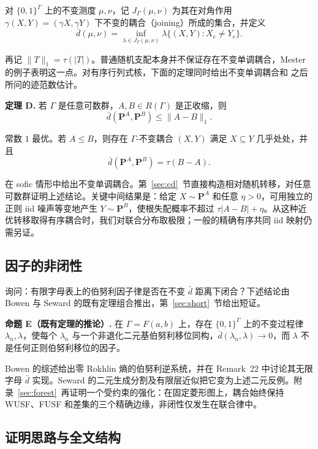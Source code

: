 \documentclass[UTF8,zihao=-4,a4paper]{ctexart}
\numberwithin{equation}{section}
\begin{document}
对 \(\{0,1\}^\Gamma\) 上的不变测度 \(\mu,\nu\)，记 \(J_\Gamma(\mu,\nu)\) 为其在对角作用 \(\gamma(X,Y)=(\gamma X,\gamma Y)\) 下不变的耦合（joining）所成的集合，并定义
\[
 \bar d(\mu,\nu)
 =\inf_{\lambda\in J_\Gamma(\mu,\nu)}
       \lambda\{(X,Y):X_e\ne Y_e\}.
\]

再记 \(\|T\|_1=\tau(|T|)\)。普通随机支配本身并不保证存在不变单调耦合，Mester 的例子表明这一点\cite[Theorem~1.5]{Mester}。对有序行列式核，下面的定理同时给出不变单调耦合和 \cite[Lemma~7.8]{LT}之后所问的迹范数估计。

\textbf{定理 D.} 若 \(\Gamma\) 是任意可数群，\(A,B\in R(\Gamma)\) 是正收缩，则
\[
 \bar d(\mathbf P^A,\mathbf P^B)\le\|A-B\|_1.
 \tag{D}\label{eq:D}
\]

常数 \(1\) 最优。若 \(A\le B\)，则存在 \(\Gamma\)-不变耦合 \((X,Y)\) 满足 \(X\subseteq Y\) 几乎处处，并且
\[
 \bar d(\mathbf P^A,\mathbf P^B)=\tau(B-A).
\]

\cite[Theorem 5.1]{LT} 在 sofic 情形中给出不变单调耦合。第~\ref{sec:cd}~节直接构造相对随机转移，对任意可数群证明上述结论。关键中间结果是：给定 \(X\sim\mathbf P^A\) 和任意 \(\eta>0\)，可用独立的正则 iid 噪声等变地产生 \(Y\sim\mathbf P^B\)，使根失配概率不超过 \(\tau|A-B|+\eta\)。从这种近优转移取得有序耦合时，我们对联合分布取极限；一般的精确有序共同 iid 映射仍需另证。

\subsection{因子的非闭性}

\cite[Question~7.6]{LT}询问：有限字母表上的伯努利因子律是否在不变 $\bar d$ 距离下闭合？下述结论由 Bowen 与 Seward 的既有定理组合推出，第~\ref{sec:short}~节给出短证。

\textbf{命题 E（既有定理的推论）.}
在 $\Gamma=F(a,b)$ 上，存在 $\{0,1\}^\Gamma$ 上的不变过程律 $\lambda_n,\lambda$，使每个 $\lambda_n$ 与一个非退化二元基伯努利移位同构，$\bar d(\lambda_n,\lambda)\to0$，而 $\lambda$ 不是任何正则伯努利移位的因子。

Bowen 的综述给出零 Rokhlin 熵的伯努利逆系统，并在 Remark~22 中讨论其无限字母 $\bar d$ 实现\cite{BowenSurvey}。Seward 的二元生成分割及有限层近似把它变为上述二元反例。附录~\ref{sec:forest}~再证明一个受约束的强化：在固定菱形图上，耦合始终保持 WUSF、FUSF 和差集的三个精确边缘，非闭性仅发生在联合律中。

\subsection{证明思路与全文结构}
\end{document}
